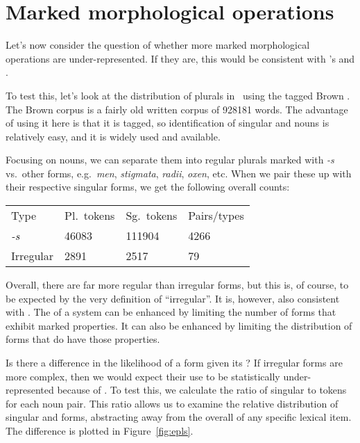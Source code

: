 \documentclass[output=paper,
modfonts
]{LSP/langsci}
\begin{document}
\section{Marked morphological operations}

Let's now consider the question of whether more marked morphological operations are under-represented. If they are, this would be consistent with \citeauthor{dimensions}'s  and \io.

To test this, let's look at the distribution of plurals in \e\ using the tagged Brown  \citep{kf}. The Brown corpus is a fairly old written corpus of 928181 words. The advantage of using it here is that it is tagged, so identification of singular and  nouns is relatively easy, and it is widely used and available.

Focusing on  nouns, we can separate them into regular plurals marked with \emph{-s} vs.\ other  forms, e.g.\ \emph{men}, \emph{stigmata}, \emph{radii}, \emph{oxen}, etc. When we pair these up with their respective singular forms, we get the following overall counts:

\ea
\begin{tabular}[t]{llll}
Type      & Pl.\ tokens & Sg.\ tokens & Pairs/types \\
\emph{-s} & 46083
          & 111904
          & 4266 \\
Irregular & 2891
          & 2517
          & 79 \\
\end{tabular}
\z

\noindent Overall, there are far more regular than irregular forms, but this is, of course, to be expected by the very definition of ``irregular''. It is, however, also consistent with \io. The  of a system can be enhanced by limiting the number of forms that exhibit marked properties. It can also be enhanced by limiting the distribution of forms that do have those properties.

Is there a difference in the likelihood of a  form given its ? If irregular forms are more complex, then we would expect their use to be statistically under-represented because of \io. To test this, we calculate the ratio of singular to  tokens for each noun pair. This ratio allows us to examine the relative distribution of singular and  forms, abstracting away from the overall  of any specific lexical item. The difference is plotted in Figure~\ref{fig:epls}.
\end{document}
